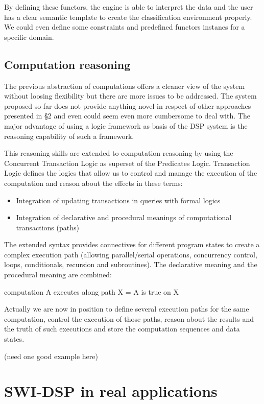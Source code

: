 \documentclass[runningheads]{llncs}
\begin{document}
By defining these functors, the engine is able to interpret the data and the user has a clear semantic template to create the classification environment properly. We could even define some constraints and predefined functors instanes for a specific domain.

\subsection{Computation reasoning}\label{subsec:ctl}

The previous abstraction of computations offers a cleaner view of the system without loosing flexibility but there are more issues to be addressed. The system proposed so far does not provide anything novel in respect of other approaches presented in \S 2 and even could seem even more cumbersome to deal with. The major advantage of using a logic framework as basis of the DSP system is the reasoning capability of such a framework. 

This reasoning skills are extended to computation reasoning by using the Concurrent Transaction Logic as superset of the Predicates Logic. Transaction Logic defines the logics that allow us to control and manage the execution of the computation and reason about the effects in these terms:

\begin{itemize}
 \item Integration of updating transactions in queries with formal logics
 \item Integration of declarative and procedural meanings of computational transactions (paths)
\end{itemize}

The extended syntax provides connectives for different program states to create a complex execution path (allowing parallel/serial operations, concurrency control, loops, conditionals, recursion and subroutines). The declarative meaning and the procedural meaning are combined:

computation A executes along path X = A is true on X

Actually we are now in position to define several execution paths for the same computation, control the execution of those paths, reason about the results and the truth of such executions and store the computation sequences and data states.

(need one good example here)

\section{SWI-DSP in real applications}\label{sec:realapp}
\end{document}
